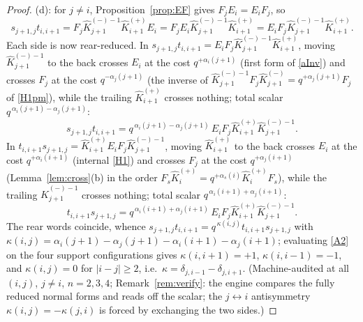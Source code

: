 \documentclass[11pt]{article}
\theoremstyle{definition}
\theoremstyle{remark}
\newcommand{\hK}{\hat K}
\begin{document}
\begin{proof}
(d): for $j\ne i$, Proposition~\ref{prop:EF} gives $F_jE_i=E_iF_j$,
so
\[
s_{j+1,j}t_{i,i+1}
=F_j\hK_{j+1}^{(-)-1}\hK_{i+1}^{(+)}E_i
=F_jE_i\hK_{j+1}^{(-)-1}\hK_{i+1}^{(+)}
=E_iF_j\hK_{j+1}^{(-)-1}\hK_{i+1}^{(+)} .
\]
Each side is now rear-reduced.  In
$s_{j+1,j}t_{i,i+1}=E_iF_j\hK_{j+1}^{(-)-1}\hK_{i+1}^{(+)}$, moving
$\hK_{j+1}^{(-)-1}$ to the back crosses $E_i$ at the cost
$q^{+\alpha_i(j+1)}$ (first form of \eqref{aInv}) and crosses
$F_j$ at the cost $q^{-\alpha_j(j+1)}$ (the inverse of
$\hK_{j+1}^{(-)-1}F_j\hK_{j+1}^{(-)}=q^{+\alpha_j(j+1)}F_j$ of
\eqref{H1pm}), while the trailing $\hK_{i+1}^{(+)}$ crosses
nothing; total scalar
$q^{\,\alpha_i(j+1)-\alpha_j(j+1)}$:
\[
s_{j+1,j}t_{i,i+1}
=q^{\,\alpha_i(j+1)-\alpha_j(j+1)}\,
E_iF_j\hK_{i+1}^{(+)}\hK_{j+1}^{(-)-1} .
\]
In
$t_{i,i+1}s_{j+1,j}=\hK_{i+1}^{(+)}E_iF_j\hK_{j+1}^{(-)-1}$,
moving $\hK_{i+1}^{(+)}$ to the back crosses $E_i$ at the cost
$q^{+\alpha_i(i+1)}$ (internal \eqref{H1}) and crosses $F_j$ at the
cost $q^{+\alpha_j(i+1)}$ (Lemma~\ref{lem:cross}(b) in the order
$F_s\hK_i^{(+)}=q^{+\alpha_s(i)}\hK_i^{(+)}F_s$), while the
trailing $\hK_{j+1}^{(-)-1}$ crosses nothing; total scalar
$q^{\,\alpha_i(i+1)+\alpha_j(i+1)}$:
\[
t_{i,i+1}s_{j+1,j}
=q^{\,\alpha_i(i+1)+\alpha_j(i+1)}\,
E_iF_j\hK_{i+1}^{(+)}\hK_{j+1}^{(-)-1} .
\]
The rear words coincide, whence
$s_{j+1,j}t_{i,i+1}=q^{\,\kappa(i,j)}t_{i,i+1}s_{j+1,j}$ with
$\kappa(i,j)=\alpha_i(j+1)-\alpha_j(j+1)-\alpha_i(i+1)-\alpha_j(i+1)$;
evaluating \eqref{A2} on the four support configurations gives
$\kappa(i,i+1)=+1$, $\kappa(i,i-1)=-1$, and $\kappa(i,j)=0$ for
$|i-j|\ge2$, i.e.\
$\kappa=\delta_{j,i-1}-\delta_{j,i+1}$.  (Machine-audited at all
$(i,j)$, $j\neq i$, $n=2,3,4$; Remark~\ref{rem:verify}: the engine
compares the fully reduced normal forms and reads off the scalar;
the $j\leftrightarrow i$ antisymmetry $\kappa(i,j)=-\kappa(j,i)$ is
forced by exchanging the two sides.)


\end{proof}
\end{document}
